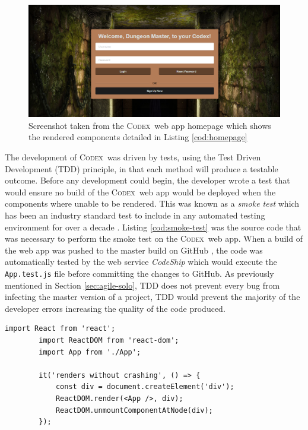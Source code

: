 \documentclass[final]{cmpreport}
\newcommand{\Codex}{\textsc{Codex}}
\begin{document}
		\begin{figure}
			\centering
			\includegraphics[width=0.8\linewidth]{homepage-developed.png}
			\caption[Screenshot of the \Codex \ web app]{Screenshot taken from the \Codex \ web app homepage which shows the rendered components detailed in Listing \ref{cod:homepage}} \label{fig:homepage}
		\end{figure}
	
		The development of \Codex \ was driven by tests, using the Test Driven Development (TDD) principle, in that each method will produce a testable outcome. Before any development could begin, the developer wrote a test that would ensure no build of the \Codex \ web app would be deployed when the components where unable to be rendered. This was known as a \emph{smoke test} which has been an industry standard test to include in any automated testing environment for over a decade \citep{testing}. Listing \ref{cod:smoke-test} was the source code that was necessary to perform the smoke test on the \Codex \ web app. When a build of the web app was pushed to the master build on GitHub \citep{github}, the code was automatically tested by the web service \emph{CodeShip} \citep{codeship} which would execute the \texttt{App.test.js} file before committing the changes to GitHub. As previously mentioned in Section \ref{sec:agile-solo}, TDD does not prevent every bug from infecting the master version of a project, TDD would prevent the majority of the developer errors increasing the quality of the code produced.
		
		\begin{lstlisting}[caption={\Codex \ web app smoke test}, label={cod:smoke-test}]
		import React from 'react';
		import ReactDOM from 'react-dom';
		import App from './App';
		
		it('renders without crashing', () => {
			const div = document.createElement('div');
			ReactDOM.render(<App />, div);
			ReactDOM.unmountComponentAtNode(div);
		});
		\end{lstlisting}
		
\end{document}
